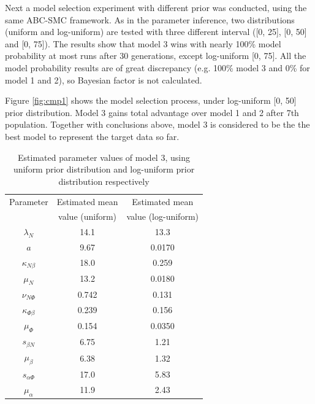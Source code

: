 Next a model selection experiment with different prior was conducted, using the same ABC-SMC framework. As in the parameter inference, two distributions (uniform and log-uniform) are tested with three different interval ([0, 25], [0, 50] and [0, 75]). The results show that model 3 wins with nearly 100\% model probability at most runs after 30 generations, except log-uniform [0, 75]. All the model probability results are of great discrepancy (e.g. 100\% model 3 and 0\% for model 1 and 2), so Bayesian factor is not calculated.

Figure \ref{fig:cmp1} shows the model selection process, under log-uniform [0, 50] prior distribution. Model 3 gains total advantage over model 1 and 2 after 7th population. Together with conclusions above, model 3 is considered to be the the best model to represent the target data so far.



\begin{table}[t!]
    \centering
    \begin{tabular}{|c c c|}
        \hline
        Parameter            & Estimated mean  & Estimated mean      \\
                             & value (uniform) & value (log-uniform) \\[0.5ex]
        \hline\hline
        $\lambda_N$          & 14.1            & 13.3                \\
        $a$                  & 9.67            & 0.0170              \\
        $\kappa_{N\beta}$    & 18.0            & 0.259               \\
        $\mu_N$              & 13.2            & 0.0180              \\
        $\nu_{N\Phi}$        & 0.742           & 0.131               \\
        \hline
        $\kappa_{\Phi\beta}$ & 0.239           & 0.156               \\
        $\mu_\Phi$           & 0.154           & 0.0350              \\
        \hline
        $s_{\beta N}$        & 6.75            & 1.21                \\
        $\mu_\beta$          & 6.38            & 1.32                \\
        \hline
        $s_{\alpha\Phi}$     & 17.0            & 5.83                \\
        $\mu_\alpha$         & 11.9            & 2.43                \\
        \hline
    \end{tabular}
    \caption[Estimated parameter values of model 3]
    {Estimated parameter values of model 3, using uniform prior distribution and log-uniform prior distribution respectively}
    \label{table:estimated1}
\end{table}

